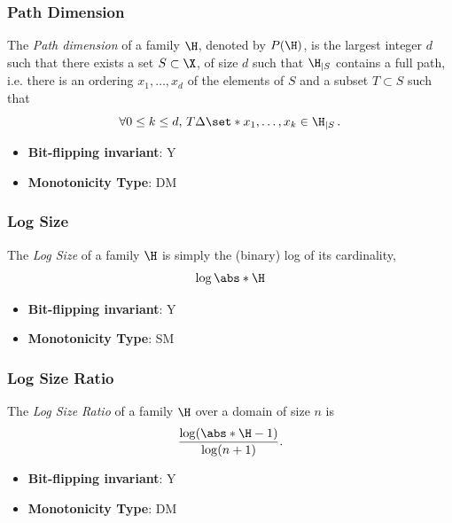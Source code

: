 \subsubsection{Path Dimension}
      
      \begin{definition}\label{def:path_dimension}
      The {\em Path dimension} of a family $\H$, denoted by $P(\H)$, is the largest integer $d$ such that there exists a set $S\subset \X$, of size $d$ such that $\H_{|S}$ contains a full path, i.e. there is an ordering $x_1,\ldots,x_d$ of the elements of $S$ and a subset $T\subset S$ such that \[ \forall 0\le k\le d,\, T\Delta \set*{x_1,\ldots,x_k} \in \H_{|S}\,. \]
      \end{definition}
      \begin{itemize}
      \item {\bf Bit-flipping invariant}: Y
      \item {\bf Monotonicity Type}: DM
      \end{itemize}
\subsubsection{Log Size}
      
      \begin{definition}\label{def:log_size}
      The {\em Log Size} of a family $\H$ is simply the (binary) log of its cardinality, \[ \log \abs*{\H} \]
      \end{definition}
      \begin{itemize}
      \item {\bf Bit-flipping invariant}: Y
      \item {\bf Monotonicity Type}: SM
      \end{itemize}
\subsubsection{Log Size Ratio}
      
      \begin{definition}\label{def:log_size_ratio}
      The {\em Log Size Ratio} of a family $\H$ over a domain of size $n$ is \[ \frac{\log(\abs*{\H}-1)}{\log(n+1)}. \]
      \end{definition}
      \begin{itemize}
      \item {\bf Bit-flipping invariant}: Y
      \item {\bf Monotonicity Type}: DM
      \end{itemize}
